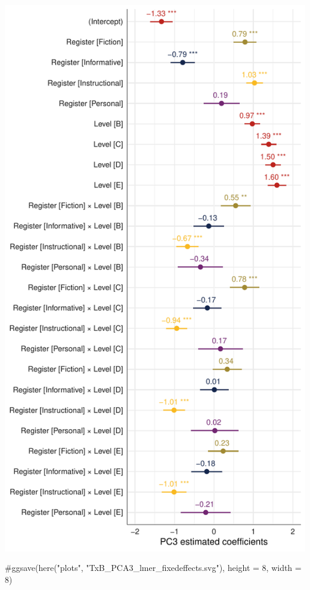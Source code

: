 \documentclass[
  letterpaper,
  DIV=11,
  numbers=noendperiod]{scrreprt}
\newenvironment{Shaded}{\begin{snugshade}}{\end{snugshade}}
\newcommand{\CommentTok}[1]{\textcolor[rgb]{0.37,0.37,0.37}{#1}}
\begin{document}
\includegraphics{AppendixF_files/figure-pdf/Dim3model-1.pdf}

\begin{Shaded}
\begin{Highlighting}[]
\CommentTok{\#ggsave(here("plots", "TxB\_PCA3\_lmer\_fixedeffects.svg"), height = 8, width = 8)}
\end{Highlighting}
\end{Shaded}
\end{document}
